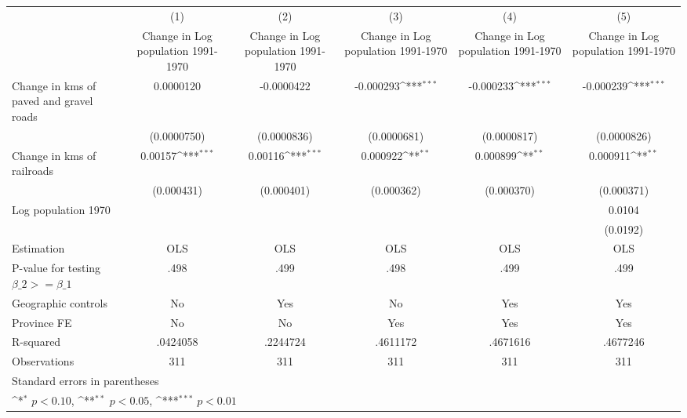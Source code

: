 {
\def\sym#1{\ifmmode^{#1}\else\(^{#1}\)\fi}
\begin{tabular}{l*{5}{c}}
\hline\hline
                    &\multicolumn{1}{c}{(1)}&\multicolumn{1}{c}{(2)}&\multicolumn{1}{c}{(3)}&\multicolumn{1}{c}{(4)}&\multicolumn{1}{c}{(5)}\\
                    &\multicolumn{1}{c}{Change in Log population 1991-1970}&\multicolumn{1}{c}{Change in Log population 1991-1970}&\multicolumn{1}{c}{Change in Log population 1991-1970}&\multicolumn{1}{c}{Change in Log population 1991-1970}&\multicolumn{1}{c}{Change in Log population 1991-1970}\\
\hline
Change in kms of paved and gravel roads&   0.0000120         &  -0.0000422         &   -0.000293\sym{***}&   -0.000233\sym{***}&   -0.000239\sym{***}\\
                    & (0.0000750)         & (0.0000836)         & (0.0000681)         & (0.0000817)         & (0.0000826)         \\
[1em]
Change in kms of railroads&     0.00157\sym{***}&     0.00116\sym{***}&    0.000922\sym{**} &    0.000899\sym{**} &    0.000911\sym{**} \\
                    &  (0.000431)         &  (0.000401)         &  (0.000362)         &  (0.000370)         &  (0.000371)         \\
[1em]
Log population 1970 &                     &                     &                     &                     &      0.0104         \\
                    &                     &                     &                     &                     &    (0.0192)         \\
\hline
Estimation          &         OLS         &         OLS         &         OLS         &         OLS         &         OLS         \\
P-value for testing $\beta\_2 >= \beta\_1$&        .498         &        .499         &        .498         &        .499         &        .499         \\
Geographic controls &          No         &         Yes         &          No         &         Yes         &         Yes         \\
Province FE         &          No         &          No         &         Yes         &         Yes         &         Yes         \\
R-squared           &    .0424058         &    .2244724         &    .4611172         &    .4671616         &    .4677246         \\
Observations        &         311         &         311         &         311         &         311         &         311         \\
\hline\hline
\multicolumn{6}{l}{\footnotesize Standard errors in parentheses}\\
\multicolumn{6}{l}{\footnotesize \sym{*} \(p<0.10\), \sym{**} \(p<0.05\), \sym{***} \(p<0.01\)}\\
\end{tabular}
}
